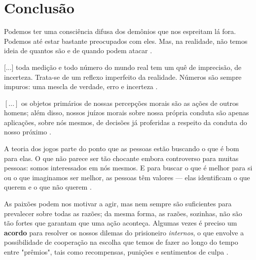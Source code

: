 \documentclass[
	article,			        %
	11pt,				          %
	oneside,			        %
	a4paper,			        %
	english,			        %
	brazil,				        %
	sumario=tradicional
]{abntex2}\usepackage[]{graphicx}\usepackage[]{color}
\begin{document}
% 

\section{Conclusão}
\label{sec:conclusao}

\begin{citacao}
  Podemos ter uma consciência difusa dos demônios que nos espreitam lá fora. Podemos até estar bastante preocupados com eles. Mas, na realidade, não temos ideia de quantos são e de quando podem atacar \cite{Nate.2012}.
\end{citacao}

\begin{citacao}

[...] toda medição e todo número do mundo real tem um quê de imprecisão, de incerteza. Trata-se de um reflexo imperfeito da realidade. Números são sempre impuros: uma mescla de verdade, erro e incerteza \cite{Seife.2012}.

\end{citacao}


\begin{citacao}
$\left [ ... \right ]$ os objetos primários de nossas percepções morais são as ações de outros homens; além disso, nossos juízos morais sobre nossa própria conduta são apenas aplicações, sobre nós mesmos, de decisões já proferidas a respeito da conduta do nosso próximo \cite{Smith.1999}.
\end{citacao}

\begin{citacao}
  A teoria dos jogos parte do ponto que as pessoas estão buscando o que é bom para elas. O que não parece ser tão chocante embora controverso para muitas pessoas: somos interessados em nós mesmos. E para buscar o que é melhor para si ou o que imaginamos ser melhor, as pessoas têm valores --- elas identificam o que querem e o que não querem \cite[min.~2:17--2:37]{MesquitaTED.2009}. 
\end{citacao}


\begin{citacao}
As paixões podem nos motivar a agir, mas nem sempre são suficientes para prevalecer sobre todas as razões; da mesma forma, as razões, sozinhas, não são tão fortes que garantam que uma ação aconteça. Algumas vezes é preciso um \textbf{acordo} para resolver os nossos dilemas do prisioneiro \emph{internos}, o que envolve a possibilidade de cooperação na escolha que temos de fazer ao longo do tempo entre "prêmios", tais como recompensas, punições e sentimentos de culpa \cite[p.~132]{Pimentel.2007}.
\end{citacao}
\end{document}
